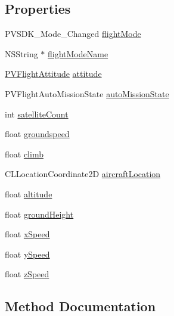 \subsection*{Properties}
\begin{DoxyCompactItemize}
\item 
P\+V\+S\+D\+K\+\_\+\+Mode\+\_\+\+Changed \hyperlink{interface_p_v_flight_helper_ab32768fa9a08e0394bbfc450a169cab0}{flight\+Mode}
\item 
N\+S\+String $\ast$ \hyperlink{interface_p_v_flight_helper_a3cb86e649ca3536f17d72f1c8af2e946}{flight\+Mode\+Name}
\item 
\hyperlink{struct_p_v_flight_attitude}{P\+V\+Flight\+Attitude} \hyperlink{interface_p_v_flight_helper_aa2ecba2c7d5425af75603c259dd69515}{attitude}
\item 
P\+V\+Flight\+Auto\+Mission\+State \hyperlink{interface_p_v_flight_helper_af4034c306e61859eb27c466439686e87}{auto\+Mission\+State}
\item 
int \hyperlink{interface_p_v_flight_helper_acf910f85facd8a241492a5c8f2c9086e}{satellite\+Count}
\item 
float \hyperlink{interface_p_v_flight_helper_a36b2f6138de807b54e6398649b508bf9}{groundspeed}
\item 
float \hyperlink{interface_p_v_flight_helper_a5dc61c7751fce36aea567bff97f7f04f}{climb}
\item 
C\+L\+Location\+Coordinate2D \hyperlink{interface_p_v_flight_helper_a1ec01183214a4d6ee524d779f8434416}{aircraft\+Location}
\item 
float \hyperlink{interface_p_v_flight_helper_a6eef7fe2b372de8eecccabbd093d6ccd}{altitude}
\item 
float \hyperlink{interface_p_v_flight_helper_aacbe767eba2cccd8aa69227423499f64}{ground\+Height}
\item 
float \hyperlink{interface_p_v_flight_helper_aa49f0ab35f579d8ce9053cc90506dd35}{x\+Speed}
\item 
float \hyperlink{interface_p_v_flight_helper_ad3cecb3402abf018180f51ae9d9c2d1a}{y\+Speed}
\item 
float \hyperlink{interface_p_v_flight_helper_af6e757bedc779483fcdbef944fb866e7}{z\+Speed}
\end{DoxyCompactItemize}


\subsection{Method Documentation}
\mbox{\label{interface_p_v_flight_helper_a7559e8c1ab7b0bfccff926ca9df58ac1}} 
